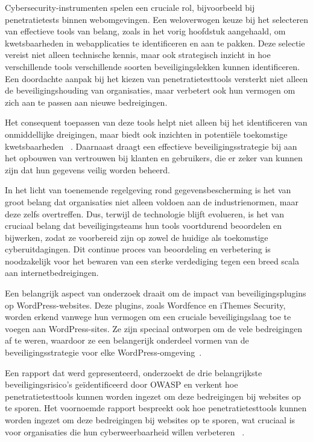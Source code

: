 Cybersecurity-instrumenten spelen een cruciale rol, bijvoorbeeld bij penetratietests binnen webomgevingen. Een weloverwogen keuze bij het
selecteren van effectieve tools van belang, zoals in het vorig hoofdstuk aangehaald, om kwetsbaarheden in webapplicaties te identificeren en aan te pakken. 
Deze selectie vereist niet alleen technische kennis, maar ook strategisch inzicht in hoe verschillende tools verschillende 
soorten beveiligingslekken kunnen identificeren.
Een doordachte aanpak bij het kiezen van penetratietesttools versterkt niet alleen de beveiligingshouding 
van organisaties, maar verbetert ook hun vermogen om zich aan te passen aan nieuwe bedreigingen. 

Het consequent toepassen van deze tools helpt niet alleen bij het identificeren van onmiddellijke dreigingen, maar 
biedt ook inzichten in potentiële toekomstige kwetsbaarheden ~\autocite{Albahar2022}.
Daarnaast draagt een effectieve beveiligingsstrategie bij aan het opbouwen van vertrouwen bij klanten en gebruikers, die er 
zeker van kunnen zijn dat hun gegevens veilig worden beheerd. 

In het licht van toenemende regelgeving rond gegevensbescherming 
is het van groot belang dat organisaties niet alleen voldoen aan de industrienormen, maar deze zelfs overtreffen.
Dus, terwijl de technologie blijft evolueren, is het van cruciaal belang dat beveiligingsteams hun tools voortdurend 
beoordelen en bijwerken, zodat ze voorbereid zijn op zowel de huidige als toekomstige cyberuitdagingen. Dit continue 
proces van beoordeling en verbetering is noodzakelijk voor het bewaren van een sterke verdediging tegen een breed scala 
aan internetbedreigingen.

Een belangrijk aspect van onderzoek draait om de impact van beveiligingsplugins op WordPress-websites. Deze plugins, zoals Wordfence en iThemes Security, worden 
erkend vanwege hun vermogen om een cruciale beveiligingslaag toe te voegen aan WordPress-sites. Ze zijn speciaal ontworpen om de vele bedreigingen af 
te weren, waardoor ze een belangerijk onderdeel vormen van de beveiligingsstrategie voor elke WordPress-omgeving~\autocite{Casola2020}.

Een rapport dat werd gepresenteerd, onderzoekt de drie belangrijkste beveiligingsrisico's geïdentificeerd door OWASP en verkent hoe penetratietesttools kunnen 
worden ingezet om deze bedreigingen bij websites op te sporen. Het voornoemde rapport bespreekt ook hoe 
penetratietesttools kunnen worden ingezet om deze bedreigingen bij websites op te sporen, wat cruciaal is voor organisaties die hun cyberweerbaarheid willen verbeteren
~\autocite{Sharma2023}.

